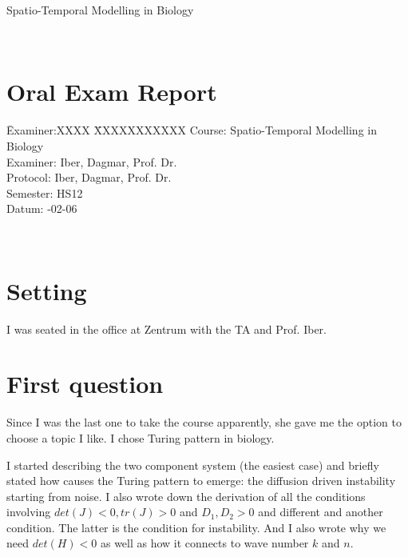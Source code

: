 \documentclass[a4paper,12pt]{article}
\title{\headtitle}
\author{VIS}
\def\headtitle{Spatio-Temporal Modelling in Biology} %
\begin{document}
\pagestyle{empty}
\parindent 0pt	%
\flushleft %
%
%
\color[rgb]{0,0,.5}
{\LARGE \headtitle\par}
\hrulefill\\
%
\section*{Oral Exam Report}
\vspace{.5cm}
  \begin{tabbing}
    \quad \= Examiner:XXXX \= XXXXXXXXXXX \kill %
    \>Course:		\>	\headtitle\\[1ex]
    \>Examiner: 	\>	Iber, Dagmar, Prof. Dr.\\[1ex]	%
    \>Protocol: 	\>	Iber, Dagmar, Prof. Dr.\\[1ex]	%
    \>Semester:	\>	HS12\\[1ex]	%
    \>Datum: 		-02-06%
  \end{tabbing}
%
\hrulefill\\
\color{black}
\vspace{.7cm}


\section{Setting}

I was seated in the office at Zentrum with the TA and Prof. Iber.

\section{First question}

Since I was the last one to take the course apparently, she gave me the option to choose a topic I like. I chose Turing pattern in biology.

I started describing the two component system (the easiest case) and briefly stated how causes the Turing pattern to emerge: the diffusion driven instability starting from noise. I also wrote down the derivation of all the conditions involving $det(J) < 0, tr(J) > 0$ and $D_1, D_2 > 0$ and different and another condition. The latter is the condition for instability. And I also wrote why we need $det(H) < 0$ as well as how it connects to wave number $k$ and $n$. 
\end{document}
